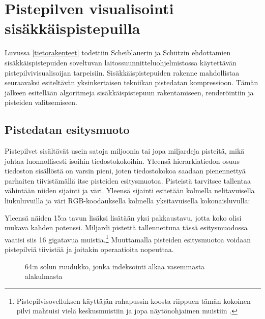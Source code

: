 \section{Pistepilven visualisointi sisäkkäispistepuilla}\label{mun}

Luvussa \ref{tietorakenteet} todettiin Scheiblauerin ja Schützin ehdottamien sisäkkäispistepuiden soveltuvan laitossuunnitteluohjelmistossa käytettävän pistepilvivisualisoijan tarpeisiin. Sisäkkäispistepuiden rakenne mahdollistaa seuraavaksi esiteltävän yksinkertaisen tekniikan pistedatan kompressioon. Tämän jälkeen esitellään algoritmeja sisäkkäispistepuun rakentamiseen, renderöintiin ja pisteiden valitsemiseen.    

\subsection{Pistedatan esitysmuoto}\label{kompressio}

Pistepilvet sisältävät usein satoja miljoonia tai jopa miljardeja pisteitä, mikä johtaa luonnollisesti isoihin tiedostokokoihin. Yleensä hierarkiatiedon osuus tiedoston sisällöstä on varsin pieni, joten tiedostokokoa saadaan pienennettyä parhaiten tiivistämällä itse pisteiden esitysmuotoa. Pisteistä tarvitsee tallentaa vähintään niiden sijainti ja väri. Yleensä sijainti esitetään kolmella nelitavuisella liukuluvuilla ja väri RGB-koodauksella kolmella yksitavuisella kokonaisluvulla:


\noindent Yleensä näiden 15:a tavun lisäksi lisätään yksi pakkaustavu, jotta koko olisi mukava kahden potenssi. Miljardi pistettä tallennettuna tässä esitysmuodossa vaatisi siis 16 gigatavua muistia.\footnote{Pistepilvisovelluksen käyttäjän rahapussin koosta riippuen tämän kokoinen pilvi mahtuisi vielä keskusmuistiin ja jopa näytönohjaimen muistiin \cite{rtx}.} Muuttamalla pisteiden esitysmuotoa voidaan pistepilviä tiivistää ja joitakin operaatioita nopeuttaa.

\begin{figure}
    
    \caption{64:n solun ruudukko, jonka indeksointi alkaa vasemmasta alakulmasta}
    \label{ruudukkokuva}
\end{figure}

